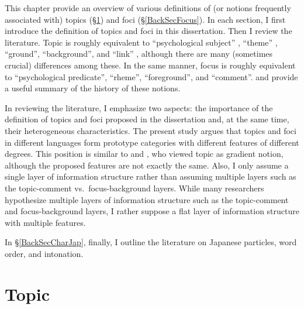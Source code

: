 This chapter provide an overview of various definitions of (or notions frequently associated with) topics (\S \ref{BackSecTopic}) and foci (\S \ref{BackSecFocus}).
In each section,
I first introduce the definition of topics and foci in this dissertation.
Then I review the literature.
Topic is roughly equivalent to ``psychological subject'' \cite{gabelentz69}, ``theme'' \cite[e.g.,][]{danes70,halliday04}, ``ground'', ``background'', and ``link'' \cite{vallduvi94},
although there are many (sometimes crucial) differences among these.
In the same manner,
focus is roughly equivalent to ``psychological predicate'', ``rheme'', ``foreground'', and ``comment''.
 and  provide a useful summary of the history of these notions.

In reviewing the literature,
I emphasize two aspects:
the importance of the definition of topics and foci proposed in the dissertation and, at the same time,
their heterogeneous characteristics.
The present study argues that topics and foci in different languages form prototype categories with different features of different degrees.
This position is similar to  and ,
who viewed topic as gradient notion,
although the proposed features are not exactly the same.
Also, I only assume a single layer of information structure
rather than assuming multiple layers such as the topic-comment vs.~focus-background layers.
While many researchers hypothesize multiple layers of information structure such as the topic-comment and focus-background layers,
I rather suppose a flat layer of information structure with multiple features.


In \S \ref{BackSecCharJap}, finally,
I outline the literature on Japanese particles, word order, and intonation.


\section{Topic}\label{BackSecTopic}

